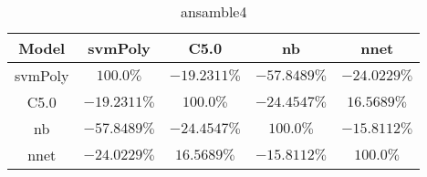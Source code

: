 \begin{table}[!ht]
	\centering
	\begin{tabular}{|c|c|c|c|c|}
		\hline
		Model & svmPoly & C5.0 & nb & nnet \\ \hline
		svmPoly & $100.0\%$ & $-19.2311\%$ & $-57.8489\%$ & $-24.0229\%$ \\ \hline
		C5.0 & $-19.2311\%$ & $100.0\%$ & $-24.4547\%$ & $16.5689\%$ \\ \hline
		nb & $-57.8489\%$ & $-24.4547\%$ & $100.0\%$ & $-15.8112\%$ \\ \hline
		nnet & $-24.0229\%$ & $16.5689\%$ & $-15.8112\%$ & $100.0\%$ \\ \hline
	\end{tabular}
	\caption{ansamble4}
	\label{tab:ansamble4}
\end{table}
